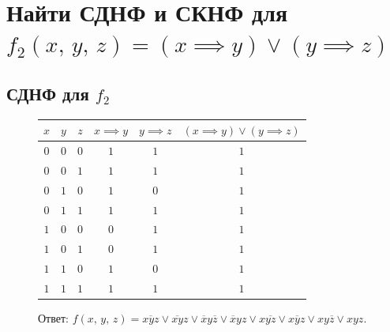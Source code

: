 \documentclass[12pt,a4paper]{article}
\theoremstyle{plain}
\theoremstyle{definition}
\theoremstyle{remark}
\numberwithin{equation}{section}
\begin{document}
\section{Найти СДНФ и СКНФ для $f_2(x,\,y,\,z) = (x \implies y) \lor (y \implies z)$}

\subsection{СДНФ для $f_2$}

\begin{figure}[H]
  \begin{minipage}[t]{0.55\textwidth}
    \vspace{0em}
    \begin{tabularx}{\textwidth}{|c|c|c|c|c|C|}
      \hline
      $x$ & $y$ & $z$ & $x \implies y$ & $y \implies z$ & $(x \implies y) \lor (y \implies z)$ \\
      \hline
      $0$ & $0$ & $0$ & $1$ & $1$ & $1$ \\
      $0$ & $0$ & $1$ & $1$ & $1$ & $1$ \\  
      $0$ & $1$ & $0$ & $1$ & $0$ & $1$ \\
      $0$ & $1$ & $1$ & $1$ & $1$ & $1$ \\
      $1$ & $0$ & $0$ & $0$ & $1$ & $1$ \\
      $1$ & $0$ & $1$ & $0$ & $1$ & $1$ \\
      $1$ & $1$ & $0$ & $1$ & $0$ & $1$ \\
      $1$ & $1$ & $1$ & $1$ & $1$ & $1$ \\
      \hline  
    \end{tabularx}
    
    \vspace{0.5em}
    \noindent Ответ: $f(x,\,y,\,z) = \overline{xyz} \lor \overline{xy}z \lor \overline{x}y\overline{z} \lor \overline{x}yz \lor x\overline{yz} \lor x\overline{y}z \lor xy\overline{z} \lor xyz$.


\end{minipage}
\end{figure}
\end{document}
